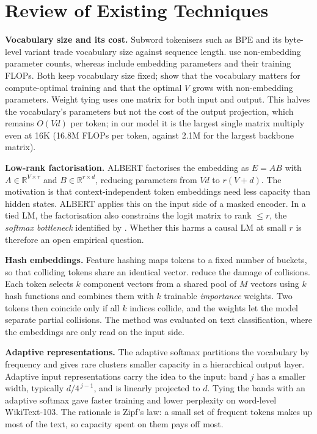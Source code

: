 \documentclass[10pt,a4paper]{article}
\begin{document}
\section{Review of Existing Techniques}
\label{sec:related}

\textbf{Vocabulary size and its cost.} Subword tokenisers such as BPE \citep{sennrich2016bpe} and its
byte-level variant \citep{radford2019gpt2} trade vocabulary size against sequence length. \citet{kaplan2020scaling} use non-embedding parameter counts, whereas
\citet{hoffmann2022chinchilla} include embedding parameters and their training FLOPs. Both keep vocabulary size fixed;
\citet{tao2024vocab} show that the vocabulary matters for compute-optimal training and that the optimal
$V$ grows with non-embedding parameters. Weight tying \citep{press2017tying,inan2017tying} uses one matrix
for both input and output. This halves the vocabulary's parameters but not the cost of the output projection,
which remains $O(Vd)$ per token; in our model it is the largest single matrix multiply even at 16K (16.8M FLOPs
per token, against 2.1M for the largest backbone matrix).

\textbf{Low-rank factorisation.} ALBERT \citep{lan2020albert} factorises the embedding as
$E=AB$ with $A\in\mathbb{R}^{V\times r}$ and $B\in\mathbb{R}^{r\times d}$, reducing parameters from $Vd$ to
$r(V+d)$. The motivation is that context-independent token embeddings need less capacity than hidden
states. ALBERT applies this on the input side of a masked encoder. In a tied LM, the factorisation also
constrains the logit matrix to rank $\le r$, the \emph{softmax bottleneck} identified by
\citet{yang2018softmax}. Whether this harms a causal LM at small $r$ is therefore an open empirical question.

\textbf{Hash embeddings.} Feature hashing \citep{weinberger2009hashing} maps tokens to a fixed number of
buckets, so that colliding tokens share an identical vector. \citet{svenstrup2017hash} reduce the
damage of collisions. Each token selects $k$ component vectors from a shared pool of $M$ vectors using $k$
hash functions and combines them with $k$ trainable \emph{importance} weights. Two tokens then coincide
only if all $k$ indices collide, and the weights let the model separate partial collisions. The method was
evaluated on text classification, where the embeddings are only read on the input side.

\textbf{Adaptive representations.} The adaptive softmax \citep{grave2017adaptivesoftmax} partitions the
vocabulary by frequency and gives rare clusters smaller capacity in a hierarchical output layer. Adaptive
input representations \citep{baevski2019adaptive} carry the idea to the input: band $j$ has a smaller
width, typically $d/4^{\,j-1}$, and is linearly projected to $d$. Tying the bands with an adaptive softmax gave
faster training and lower perplexity on word-level WikiText-103. The rationale is Zipf's law: a small set of
frequent tokens makes up most of the text, so capacity spent on them pays off most.
\end{document}
